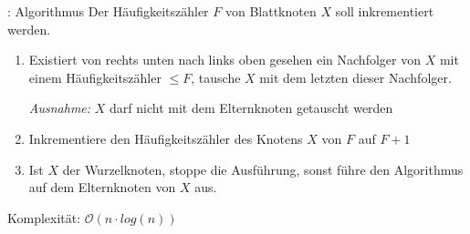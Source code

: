 \documentclass[xcolor=dvipsnames,presentation]{beamer}    %
\begin{document}
\begin{frame}{\insertsubsection}
\begin{figure}
\centering
{}
\end{figure}
\end{frame}

\begin{frame}{\insertsubsection: Algorithmus}
  Der Häufigkeitszähler $F$ von Blattknoten $X$ soll inkrementiert werden.

  \vspace{1cm}

  \begin{enumerate}
  \item Existiert von rechts unten nach links oben gesehen ein
    Nachfolger von $X$ mit einem Häufigkeitszähler $\leq F$, tausche
    $X$ mit dem letzten dieser Nachfolger.

    \emph{Ausnahme:} $X$ darf nicht mit dem Elternknoten getauscht werden
  \item Inkrementiere den Häufigkeitszähler des Knotens $X$ von $F$ auf $F+1$

  \item Ist $X$ der Wurzelknoten, stoppe die Ausführung, sonst führe
    den Algorithmus auf dem Elternknoten von $X$ aus.
  \end{enumerate}

  \vspace{1cm}

  Komplexität: $\mathcal{O}(n \cdot log(n))$
\end{frame}
\end{document}
